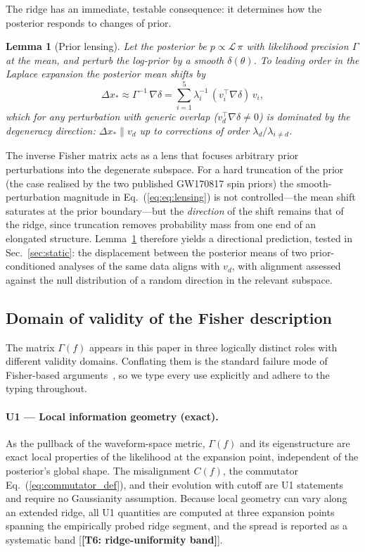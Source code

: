 \documentclass[twocolumn,prd,showpacs,superscriptaddress]{revtex4-2}
\newtheorem{lemma}{Lemma}
\newcommand{\vd}{v_{d}}          %
\newcommand{\secref}[1]{Sec.~\ref{sec:#1}}
\newcommand{\eqnref}[1]{Eq.~(\ref{eq:#1})}
\newcommand{\manifest}[1]{\textbf{[#1]}}
\begin{document}
The ridge has an immediate, testable consequence: it determines how the
posterior responds to changes of prior.

\begin{lemma}[Prior lensing]
\label{lem:lensing}
Let the posterior be $p \propto \mathcal{L}\,\pi$ with likelihood
precision $\Gamma$ at the mean, and perturb the log-prior by a smooth
$\delta(\theta)$.  To leading order in the Laplace expansion the
posterior mean shifts by
\begin{equation}
\Delta x_{*} \approx \Gamma^{-1}\,\nabla\delta
= \sum_{i=1}^{5} \lambda_i^{-1}\,(v_i^{\top}\nabla\delta)\,v_i ,
\label{eq:lensing}
\end{equation}
which for any perturbation with generic overlap
($v_d^{\top}\nabla\delta \neq 0$) is dominated by the degeneracy
direction: $\Delta x_{*} \parallel \vd$ up to corrections of order
$\lambda_d/\lambda_{i\neq d}$.
\end{lemma}

The inverse Fisher matrix acts as a lens that focuses arbitrary prior
perturbations into the degenerate subspace.  For a hard truncation of
the prior (the case realised by the two published GW170817 spin priors)
the smooth-perturbation magnitude in \eqnref{eq:lensing} is not
controlled---the mean shift saturates at the prior boundary---but the
\emph{direction} of the shift remains that of the ridge, since
truncation removes probability mass from one end of an elongated
structure.  Lemma~\ref{lem:lensing} therefore yields a directional
prediction, tested in \secref{static}: the displacement between the
posterior means of two prior-conditioned analyses of the same data
aligns with $\vd$, with alignment assessed against the null
distribution of a random direction in the relevant subspace.

\subsection{Domain of validity of the Fisher description}
\label{sec:validity}

The matrix $\Gamma(f)$ appears in this paper in three logically
distinct roles with different validity domains.  Conflating them is the
standard failure mode of Fisher-based
arguments~\cite{vallisneri2008fisher}, so we type every use explicitly
and adhere to the typing throughout.

\paragraph{U1 --- Local information geometry (exact).}
As the pullback of the waveform-space metric, $\Gamma(f)$ and its
eigenstructure are exact local properties of the likelihood at the
expansion point, independent of the posterior's global shape.  The
misalignment $C(f)$, the commutator \eqnref{commutator_def}, and their
evolution with cutoff are U1 statements and require no Gaussianity
assumption.  Because local geometry can vary along an extended ridge,
all U1 quantities are computed at three expansion points spanning the
empirically probed ridge segment, and the spread is reported as a
systematic band [\manifest{T6: ridge-uniformity band}].
\end{document}
